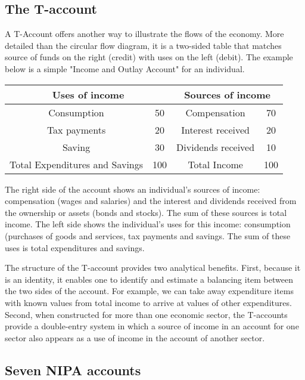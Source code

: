 \documentclass[12pt, letterpaper]{article}
\begin{document}
{\subsection{The T-account}
A T-Account offers another way to illustrate the flows of the economy. More detailed than the circular flow diagram, it is a two-sided table that matches source of funds on the right (credit) with uses on the left (debit). The example below is a simple "Income and Outlay Account" for an individual.

\begin{center}
\begin{tabular}{|c|c|c|c|}

\multicolumn{2}{c}{Uses of income} & \multicolumn{2}{c}{Sources of income}\\
\hline
Consumption & 50 & Compensation & 70\\
Tax payments & 20 & Interest received & 20\\
Saving & 30 & Dividends received & 10\\
\hline
Total Expenditures and Savings & 100 & Total Income & 100\\
\hline

\end{tabular}
\end{center}
The right side of the account shows an individual's sources of income: compensation (wages and salaries) and the interest and dividends received from the ownership or assets (bonds and stocks). The sum of these sources is total income. The left side shows the individual's uses for this income: consumption (purchases of goods and services, tax payments and savings. The sum of these uses is total expenditures and savings.

\vspace{10pt}
\noindent The structure of the T-account provides two analytical benefits. First, because it is an identity, it enables one to identify and estimate a balancing item between the two sides of the account. For example, we can take away expenditure items with known values from total income to arrive at values of other expenditures. Second, when constructed for more than one economic sector, the T-accounts provide a double-entry system in which a source of income in an account for one sector also appears as a use of income in the account of another sector. 

\subsection{Seven NIPA accounts}

}
\end{document}
